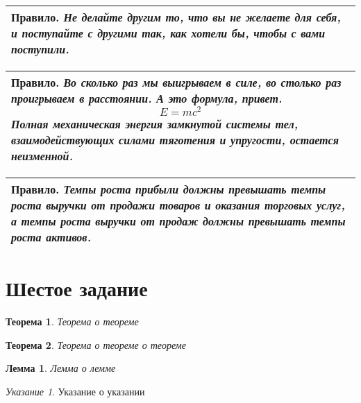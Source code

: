 \documentclass[a4paper,11pt]{article} %
\newenvironment{pravilo}{\begin{center} \begin{tabular}{|p{0.6 \textwidth}|} \hline \textbf{Правило.} \em}{ \\ \hline \end{tabular} \end{center}}
\theoremstyle{plain}
\newtheorem{theorem}{Теорема}[section]
\theoremstyle{plain}
\newtheorem{lemma}{Лемма}[section]
\theoremstyle{remark}
\newtheorem*{directive}{Указание}
\begin{document}
		\begin{pravilo}
			Не делайте другим то, что вы не желаете для себя, и поступайте с другими так, как хотели бы, чтобы с вами поступили.
		\end{pravilo}
	
		\begin{pravilo}
			Во сколько раз мы выигрываем в силе, во столько раз проигрываем в расстоянии. А это формула, привет.
			$$ E = m c^2 $$
			Полная механическая энергия замкнутой системы тел, взаимодействующих силами тяготения и упругости, остается неизменной.
		\end{pravilo}
	
		\begin{pravilo}
			Темпы роста прибыли должны превышать темпы роста выручки от продажи товаров и оказания торговых услуг, а темпы роста выручки от продаж должны превышать темпы роста активов.
		\end{pravilo}
	
		\section{Шестое задание}
		
		\begin{theorem}
			Теорема о теореме
		\end{theorem}
	
		\begin{theorem}
			Теорема о теореме о теореме
		\end{theorem}
	
		\begin{lemma}
			Лемма о лемме
		\end{lemma}
	
		\begin{directive}
			Указание о указании
		\end{directive}
		
\end{document}
